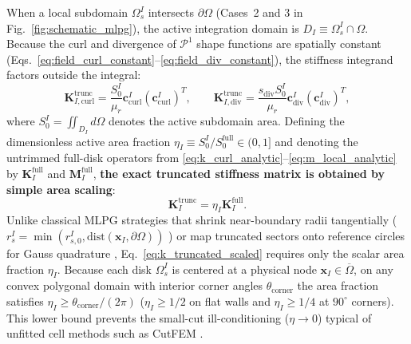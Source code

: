 \documentclass[VANCOUVER,Times1COL]{WileyNJD-v5}
\begin{document}
When a local subdomain $\Omega_s^I$ intersects $\partial\Omega$ (Cases~2 and 3 in Fig.~\ref{fig:schematic_mlpg}), the active integration domain is $D_I \equiv \Omega_s^I \cap \Omega$. Because the curl and divergence of $\mathcal{P}^1$ shape functions are spatially constant (Eqs.~\eqref{eq:field_curl_constant}--\eqref{eq:field_div_constant}), the stiffness integrand factors outside the integral:
\begin{equation}
    \mathbf{K}_{I, \mathrm{curl}}^{\mathrm{trunc}} = \frac{S_0^I}{\mu_r} \mathbf{c}_{\mathrm{curl}}^I (\mathbf{c}_{\mathrm{curl}}^I)^T, \qquad
    \mathbf{K}_{I, \mathrm{div}}^{\mathrm{trunc}} = \frac{s_{\mathrm{div}} S_0^I}{\mu_r} \mathbf{c}_{\mathrm{div}}^I (\mathbf{c}_{\mathrm{div}}^I)^T,
    \label{eq:k_curl_truncated}
\end{equation}
where $S_0^I = \iint_{D_I} d\Omega$ denotes the active subdomain area. Defining the dimensionless active area fraction $\eta_I \equiv S_0^I / S_0^{\mathrm{full}} \in (0, 1]$ and denoting the untrimmed full-disk operators from \eqref{eq:k_curl_analytic}--\eqref{eq:m_local_analytic} by $\mathbf{K}_I^{\mathrm{full}}$ and $\mathbf{M}_I^{\mathrm{full}}$, \textbf{the exact truncated stiffness matrix is obtained by simple area scaling}:
\begin{equation}
    \mathbf{K}_I^{\mathrm{trunc}} = \eta_I \mathbf{K}_I^{\mathrm{full}}.
    \label{eq:k_truncated_scaled}
\end{equation}
Unlike classical MLPG strategies that shrink near-boundary radii tangentially ($r_s^I = \min(r_{s,0}^I, \mathrm{dist}(\mathbf{x}_I, \partial\Omega))$ \cite{atluri2002meshless}) or map truncated sectors onto reference circles for Gauss quadrature \cite{atluri2004meshless}, Eq.~\eqref{eq:k_truncated_scaled} requires only the scalar area fraction $\eta_I$. Because each disk $\Omega_s^I$ is centered at a physical node $\mathbf{x}_I \in \overline{\Omega}$, on any convex polygonal domain with interior corner angles $\theta_{\mathrm{corner}}$ the area fraction satisfies $\eta_I \ge \theta_{\mathrm{corner}}/(2\pi)$ ($\eta_I \ge 1/2$ on flat walls and $\eta_I \ge 1/4$ at $90^\circ$ corners). This lower bound prevents the small-cut ill-conditioning ($\eta \to 0$) typical of unfitted cell methods such as CutFEM \cite{hansbo2002unfitted}.
\end{document}
